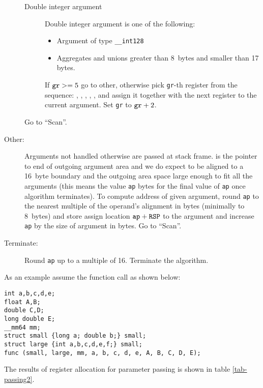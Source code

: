 \begin{description}
\begin{description}
    \item[Double integer argument]
      Double integer argument is one of the following:
      \begin{itemize}
        \item Argument of type \verb|__int128|
        \item Aggregates and unions greater than 8~bytes and smaller
          than 17 bytes.
      \end{itemize}
      If $\verb|gr| >= 5$ go to other, otherwise pick \verb|gr|-th register from
      the sequence: \RAX, \RDX, \RCX, \RBX, \RSI, \RDI{} and assign it together with the
      next register to the current argument.
      Set \verb|gr| to $\verb|gr|+2$.
   \end{description}
   Go to ``Scan''.

  \item[Other:]

    Arguments not handled otherwise are passed at stack frame. \RSP{} is the
    pointer to end of outgoing argument area and we do expect \RSP{} to be
    aligned to a 16~byte boundary and the outgoing area space large enough to fit all
    the arguments (this means the value \verb|ap| bytes for the final value of
    \verb|ap| once algorithm terminates).  To compute address of given argument,
    round \verb|ap| to the nearest multiple of the operand's alignment in bytes
    (minimally to 8~bytes) and
    store assign location $\verb|ap|+\RSP$ to the argument and increase \verb|ap| by
    the size of argument in bytes.
    Go to ``Scan''.

  \item[Terminate:]
    Round \verb|ap| up to a multiple of 16. Terminate the algorithm.
\end{description}

As an example assume the function call as shown below:

\begin{verbatim}
int a,b,c,d,e;
float A,B;
double C,D;
long double E;
__mm64 mm;
struct small {long a; double b;} small;
struct large {int a,b,c,d,e,f;} small;
func (small, large, mm, a, b, c, d, e, A, B, C, D, E);
\end{verbatim}

The results of register allocation for parameter passing is shown in table \ref{tab-passing2}.

